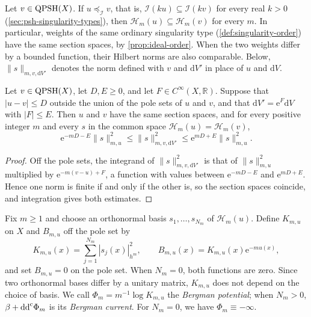 Let $v\in\mathrm{QPSH}(X)$. If $u\preceq_{\mathcal I}v$, that is, $\mathcal I(ku)\subseteq\mathcal I(kv)$ for every real $k>0$ (\cref{sec:psh-singularity-types}), then $\mathcal H_m(u)\subseteq\mathcal H_m(v)$ for every $m$. In particular, weights of the same ordinary singularity type (\cref{def:singularity-order}) have the same section spaces, by \cref{prop:ideal-order}. When the two weights differ by a bounded function, their Hilbert norms are also comparable. Below, $\|s\|_{m,v,\mathrm{d}V'}$ denotes the norm defined with $v$ and $\mathrm{d}V'$ in place of $u$ and $\mathrm{d}V$.

\begin{proposition}\label{prop:section-norm-comparison}
Let $v\in\mathrm{QPSH}(X)$, let $D,E\geq0$, and let $F\in C^\infty(X,\mathbb R)$. Suppose that $|u-v|\leq D$ outside the union of the pole sets of $u$ and $v$, and that $\mathrm{d}V'=\mathrm{e}^F \mathrm{d}V$ with $|F|\leq E$. Then $u$ and $v$ have the same section spaces, and for every positive integer $m$ and every $s$ in the common space $\mathcal H_m(u)=\mathcal H_m(v)$,
\[
 \mathrm{e}^{-mD-E}\|s\|_{m,u}^2
 \leq\|s\|_{m,v,\mathrm{d}V'}^2
 \leq \mathrm{e}^{mD+E}\|s\|_{m,u}^2.
\]
\end{proposition}
\begin{proof}
Off the pole sets, the integrand of $\|s\|_{m,v,\mathrm{d}V'}^2$ is that of $\|s\|_{m,u}^2$ multiplied by $\mathrm{e}^{-m(v-u)+F}$, a function with values between $\mathrm{e}^{-mD-E}$ and $\mathrm{e}^{mD+E}$. Hence one norm is finite if and only if the other is, so the section spaces coincide, and integration gives both estimates.
\end{proof}

Fix $m\geq1$ and choose an orthonormal basis $s_1,\ldots,s_{N_m}$ of $\mathcal H_m(u)$. Define $K_{m,u}$ on $X$ and $B_{m,u}$ off the pole set by
\[
 K_{m,u}(x)=\sum_{j=1}^{N_m}|s_j(x)|_{h^m}^2,
 \qquad B_{m,u}(x)=K_{m,u}(x)\mathrm{e}^{-mu(x)},
\]
and set $B_{m,u}=0$ on the pole set. When $N_m=0$, both functions are zero. Since two orthonormal bases differ by a unitary matrix, $K_{m,u}$ does not depend on the choice of basis. We call $\Phi_m=m^{-1}\log K_{m,u}$ the \emph{Bergman potential}; when $N_m>0$, $\beta+\mathrm{dd}^{\mathrm{c}}\Phi_m$ is its \emph{Bergman current}. For $N_m=0$, we have $\Phi_m\equiv-\infty$.

